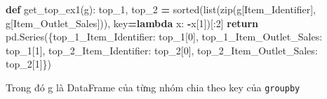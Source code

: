 \documentclass[
]{book}
\newenvironment{Shaded}{\begin{snugshade}}{\end{snugshade}}
\newcommand{\BuiltInTok}[1]{#1}
\newcommand{\ControlFlowTok}[1]{\textcolor[rgb]{0.13,0.29,0.53}{\textbf{#1}}}
\newcommand{\DecValTok}[1]{\textcolor[rgb]{0.00,0.00,0.81}{#1}}
\newcommand{\KeywordTok}[1]{\textcolor[rgb]{0.13,0.29,0.53}{\textbf{#1}}}
\newcommand{\NormalTok}[1]{#1}
\newcommand{\OperatorTok}[1]{\textcolor[rgb]{0.81,0.36,0.00}{\textbf{#1}}}
\newcommand{\StringTok}[1]{\textcolor[rgb]{0.31,0.60,0.02}{#1}}
\begin{document}
\begin{Shaded}
\begin{Highlighting}[]
\KeywordTok{def}\NormalTok{ get\_top\_ex1(g):}
\NormalTok{    top\_1, top\_2 }\OperatorTok{=} \BuiltInTok{sorted}\NormalTok{(}\BuiltInTok{list}\NormalTok{(}\BuiltInTok{zip}\NormalTok{(g[}\StringTok{\textquotesingle{}Item\_Identifier\textquotesingle{}}\NormalTok{], g[}\StringTok{\textquotesingle{}Item\_Outlet\_Sales\textquotesingle{}}\NormalTok{])), key}\OperatorTok{=}\KeywordTok{lambda}\NormalTok{ x: }\OperatorTok{{-}}\NormalTok{x[}\DecValTok{1}\NormalTok{])[:}\DecValTok{2}\NormalTok{]}
    \ControlFlowTok{return}\NormalTok{ pd.Series(\{}\StringTok{\textquotesingle{}top\_1\_Item\_Identifier\textquotesingle{}}\NormalTok{: top\_1[}\DecValTok{0}\NormalTok{],}
                      \StringTok{\textquotesingle{}top\_1\_Item\_Outlet\_Sales\textquotesingle{}}\NormalTok{: top\_1[}\DecValTok{1}\NormalTok{], }
                      \StringTok{\textquotesingle{}top\_2\_Item\_Identifier\textquotesingle{}}\NormalTok{: top\_2[}\DecValTok{0}\NormalTok{],}
                      \StringTok{\textquotesingle{}top\_2\_Item\_Outlet\_Sales\textquotesingle{}}\NormalTok{: top\_2[}\DecValTok{1}\NormalTok{]\})}
\end{Highlighting}
\end{Shaded}

Trong đó g là DataFrame của từng nhóm chia theo key của \texttt{groupby}
\end{document}
